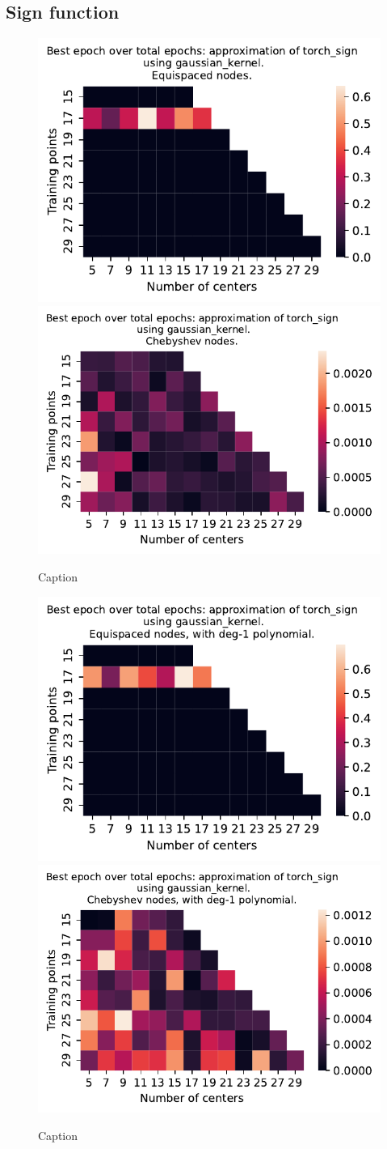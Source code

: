 \documentclass[12pt]{report} %
\begin{document}
\subsection*{Sign function}

\begin{figure}[ht]
  \centering

  \includegraphics[width=.49\textwidth]{imagenes/experiments/1d/variational_epochs/torch_sign-Kgaussian_kernel-Equi-epochs.pdf}
  \includegraphics[width=.49\textwidth]{imagenes/experiments/1d/variational_epochs/torch_sign-Kgaussian_kernel-Cheb-epochs.pdf}
  \caption{Caption}
  \label{fig:epochs-torch-sign-gaussian}
\end{figure}


\begin{figure}[ht]
  \centering

  \includegraphics[width=.49\textwidth]{imagenes/experiments/1d/variational_epochs/torch_sign-Kgaussian_kernel-Poly-Equi-epochs.pdf}
  \includegraphics[width=.49\textwidth]{imagenes/experiments/1d/variational_epochs/torch_sign-Kgaussian_kernel-Poly-Cheb-epochs.pdf}
  \caption{Caption}
  \label{fig:epochs-torch-sign-gaussian-poly}
\end{figure}
\end{document}
